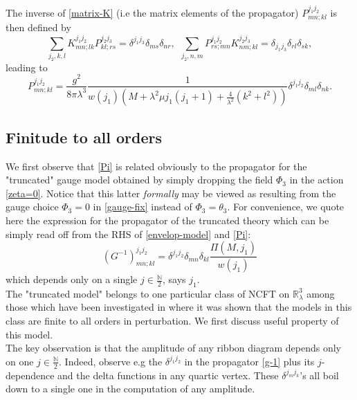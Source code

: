 \documentclass[11pt]{book}
\theoremstyle{break}
\begin{document}
The inverse of \eqref{matrix-K} (i.e the matrix elements of the propagator) $P^{j_1j_2}_{mn;kl}$ is then defined by%
%
\begin{equation}
\sum_{j_2,k,l} K^{j_1j_2}_{mn;lk} P^{j_2j_3}_{kl;rs} = \delta^{j_1j_3} \delta_{ms} \delta_{nr}, \ \ \sum_{j_2,n,m} P^{j_1j_2}_{rs;mn} K^{j_2j_3}_{nm;kl} = \delta_{j_1j_3} \delta_{rl} \delta_{sk}, \label{propagator-def}
\end{equation}
%
leading to%
%
\begin{equation}
P^{j_1j_2}_{mn;kl} = \frac{g^2}{8\pi\lambda^3} \frac{1}{w(j_1)(M+\lambda^2\mu j_1(j_1+1)+\frac{4}{\lambda^2}(k^2+l^2))}\delta^{j_1j_2}\delta_{ml}\delta_{nk}.  \label{propagator}
\end{equation}

\subsection*{Finitude to all orders}\label{subsection33}
We first observe that \eqref{Pi} is related obviously to the propagator for the "truncated" gauge model obtained by simply dropping the field $\Phi_3$ in the action \eqref{zeta=0}. Notice that this latter {\it{formally}} may be viewed as resulting from the gauge choice $\Phi_3=0$ in \eqref{gauge-fix} instead of $\Phi_3=\theta_3$. For convenience, we quote here the expression for the propagator of the truncated theory which can be simply read off from the RHS of \eqref{envelop-model} and \eqref{Pi}:
\begin{equation}
(G^{-1})^{j_1j_2}_{mn;kl}=\delta^{j_1j_2}\delta_{mn}\delta_{kl}\frac{\Pi(M,j_1)}{w(j_1)}\label{g-1}
\end{equation}
which depends only on a single $j\in\frac{\mathbb{N}}{2}$, says $j_1$.\\

The "truncated model" belongs to one particular class of NCFT on $\mathbb{R}^3_\lambda$ among those which have been investigated in \cite{vit-wal-12} where it was shown that the models in this class are finite to all orders in perturbation. We first discuss useful property of this model.\\
The key observation is that the amplitude of any ribbon diagram depends only on one $j\in\frac{\mathbb{N}}{2}$. Indeed, observe e.g the $\delta^{j_1j_2}$ in the propagator \eqref{g-1} plus its $j$-dependence and the delta functions in any quartic vertex. These $\delta^{j_mj_k}$'s all boil down to a single one in the computation of any amplitude.\\
\end{document}
